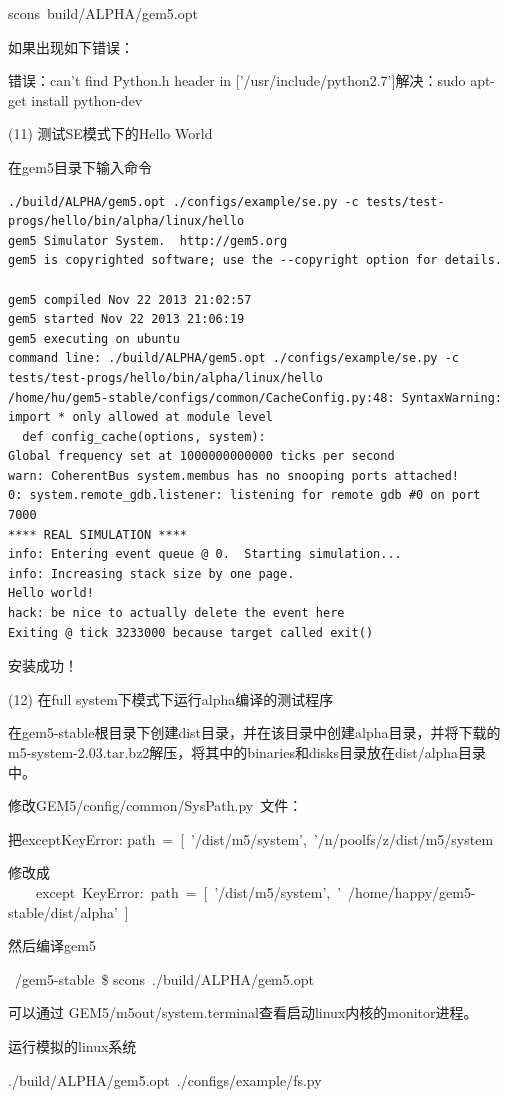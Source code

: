 scons build/ALPHA/gem5.opt

如果出现如下错误：

错误：can't find Python.h header in ['/usr/include/python2.7']解决：sudo apt-get install python-dev

(11) 测试SE模式下的Hello World

在gem5目录下输入命令
\begin{verbatim}
./build/ALPHA/gem5.opt ./configs/example/se.py -c tests/test-progs/hello/bin/alpha/linux/hello 
gem5 Simulator System.  http://gem5.org
gem5 is copyrighted software; use the --copyright option for details.

gem5 compiled Nov 22 2013 21:02:57
gem5 started Nov 22 2013 21:06:19
gem5 executing on ubuntu
command line: ./build/ALPHA/gem5.opt ./configs/example/se.py -c tests/test-progs/hello/bin/alpha/linux/hello
/home/hu/gem5-stable/configs/common/CacheConfig.py:48: SyntaxWarning: import * only allowed at module level
  def config_cache(options, system):
Global frequency set at 1000000000000 ticks per second
warn: CoherentBus system.membus has no snooping ports attached!
0: system.remote_gdb.listener: listening for remote gdb #0 on port 7000
**** REAL SIMULATION ****
info: Entering event queue @ 0.  Starting simulation...
info: Increasing stack size by one page.
Hello world!
hack: be nice to actually delete the event here
Exiting @ tick 3233000 because target called exit()
\end{verbatim}
安装成功！

(12) 在full system下模式下运行alpha编译的测试程序

在gem5-stable根目录下创建dist目录，并在该目录中创建alpha目录，并将下载的m5-system-2.03.tar.bz2解压，将其中的binaries和disks目录放在dist/alpha目录中。

修改GEM5/config/common/SysPath.py 文件：

把exceptKeyError: path = [ '/dist/m5/system', '/n/poolfs/z/dist/m5/system  

修改成  
　　except KeyError: path = [ '/dist/m5/system', ' /home/happy/gem5-stable/dist/alpha' ]

然后编译gem5

~/gem5-stable \$ scons ./build/ALPHA/gem5.opt

可以通过 GEM5/m5out/system.terminal查看启动linux内核的monitor进程。

运行模拟的linux系统

./build/ALPHA/gem5.opt ./configs/example/fs.py  

